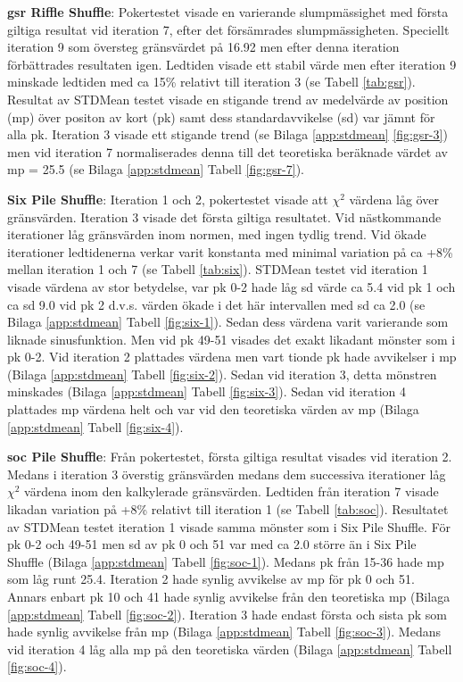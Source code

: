\documentclass[swedish,a4paper]{article}
\begin{document}
\textbf{\gls{gsr} Riffle Shuffle}: Pokertestet visade en varierande slumpmässighet
med första giltiga resultat vid iteration 7, efter det försämrades slumpmässigheten.
Speciellt iteration 9 som översteg gränsvärdet på 16.92 men efter denna iteration förbättrades
resultaten igen. Ledtiden visade ett stabil värde men efter iteration 9 minskade
ledtiden med ca 15\% relativt till iteration 3 (se Tabell
\ref{tab:gsr}).
Resultat av STDMean testet visade en stigande trend av medelvärde av position
(\gls{mp}) över positon av kort (\gls{pk}) samt dess standardavvikelse
(\gls{sd}) var jämnt för alla \gls{pk}. Iteration 3 visade ett stigande trend (se
Bilaga \ref{app:stdmean} \ref{fig:gsr-3}) men vid iteration 7 normaliserades denna
till det teoretiska beräknade värdet av \gls{mp} = 25.5 (se Bilaga
\ref{app:stdmean} Tabell \ref{fig:gsr-7}). 

\textbf{Six Pile Shuffle}: Iteration 1 och 2, pokertestet visade att $\chi^2$
värdena låg över gränsvärden. Iteration 3 visade det första giltiga resultatet.
Vid nästkommande iterationer låg gränsvärden inom normen, med ingen
tydlig trend. Vid ökade iterationer  ledtidenerna verkar varit konstanta med
minimal variation på ca +8\% mellan iteration 1 och 7 (se Tabell \ref{tab:six}).
STDMean testet vid iteration 1 visade värdena av stor betydelse, var \gls{pk} 0-2
hade låg \gls{sd} värde ca 5.4 vid \gls{pk} 1 och ca \gls{sd} 9.0 vid \gls{pk} 2
d.v.s. värden ökade i det här intervallen med \gls{sd} ca 2.0
(se Bilaga \ref{app:stdmean} Tabell  \ref{fig:six-1}).
Sedan dess värdena varit varierande som liknade sinusfunktion. Men vid \gls{pk}
49-51 visades det exakt likadant mönster som i \gls{pk} 0-2. Vid iteration 2 plattades
värdena men vart tionde \gls{pk} hade avvikelser i \gls{mp} 
(Bilaga \ref{app:stdmean} Tabell  \ref{fig:six-2}). Sedan vid iteration 3, detta
mönstren minskades (Bilaga \ref{app:stdmean} Tabell \ref{fig:six-3}).
Sedan vid iteration 4 plattades \gls{mp} värdena helt och var
vid den teoretiska värden av \gls{mp} (Bilaga \ref{app:stdmean} Tabell \ref{fig:six-4}).

\textbf{\gls{soc} Pile Shuffle}: Från pokertestet, första giltiga resultat
visades vid iteration 2. Medans i iteration 3 överstig gränsvärden medans dem
successiva iterationer låg $\chi^2$ värdena inom den kalkylerade gränsvärden.
Ledtiden från iteration 7 visade likadan  variation på +8\% relativt till
iteration 1 (se Tabell \ref{tab:soc}). Resultatet av STDMean testet iteration 1
visade samma mönster som i Six Pile Shuffle. För \gls{pk} 0-2 och 49-51 men
\gls{sd} av \gls{pk} 0 och 51 var med ca 2.0 större än i Six Pile Shuffle
(Bilaga \ref{app:stdmean} Tabell \ref{fig:soc-1}). Medans \gls{pk} från 15-36
hade \gls{mp} som låg runt 25.4. Iteration 2 hade synlig avvikelse av \gls{mp}
för \gls{pk} 0 och 51. Annars enbart \gls{pk} 10 och 41 hade synlig avvikelse
från den teoretiska \gls{mp} (Bilaga \ref{app:stdmean} Tabell \ref{fig:soc-2}).
Iteration 3 hade endast första och sista \gls{pk} som hade synlig avvikelse från
\gls{mp} (Bilaga \ref{app:stdmean} Tabell \ref{fig:soc-3}). Medans vid iteration
4 låg alla \gls{mp} på den teoretiska värden (Bilaga \ref{app:stdmean} Tabell
\ref{fig:soc-4}).
\end{document}
